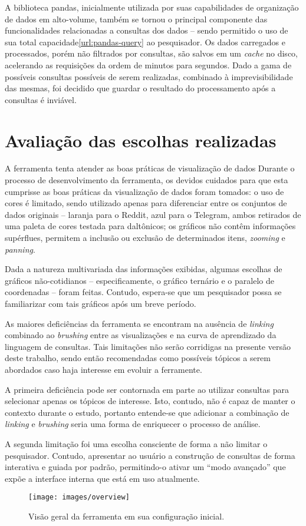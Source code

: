 A biblioteca pandas, inicialmente utilizada por suas capabilidades de organização de dados em alto-volume, também se tornou o principal componente das funcionalidades relacionadas a consultas dos dados -- sendo permitido o uso de sua total capacidade\ref{url:pandas-query} ao pesquisador. Os dados carregados e processados, porém não filtrados por consultas, são salvos em um \textit{cache} no disco, acelerando as requisições da ordem de minutos para segundos. Dado a gama de possíveis consultas possíveis de serem realizadas, combinado à imprevisibilidade das mesmas, foi decidido que guardar o resultado do processamento após a consultas é inviável.

\section{Avaliação das escolhas realizadas}

A ferramenta tenta atender as boas práticas de visualização de dados
Durante o processo de desenvolvimento da ferramenta, os devidos cuidados para que esta cumprisse as boas práticas da visualização de dados foram tomados: o uso de cores é limitado, sendo utilizado apenas para diferenciar entre os conjuntos de dados originais -- laranja para o Reddit, azul para o Telegram, ambos retirados de uma paleta de cores testada para daltônicos; os gráficos não contêm informações supérflues, permitem a inclusão ou exclusão de determinados itens, \textit{zooming} e \textit{panning}.

Dada a natureza multivariada das informações exibidas, algumas escolhas de gráficos não-cotidianos -- especificamente, o gráfico ternário e o paralelo de coordenadas -- foram feitas. Contudo, espera-se que um pesquisador possa se familiarizar com tais gráficos após um breve período.

As maiores deficiências da ferramenta se encontram na ausência de \textit{linking} combinado ao \textit{brushing} entre as visualizações e na curva de aprendizado da linguagem de consultas. Tais limitações não serão corridigas na presente versão deste trabalho, sendo então recomendadas como possíveis tópicos a serem abordados caso haja interesse em evoluir a ferramente.

A primeira deficiência pode ser contornada em parte ao utilizar consultas para selecionar apenas os tópicos de interesse. Isto, contudo, não é capaz de manter o contexto durante o estudo, portanto entende-se que adicionar a combinação de \textit{linking} e \textit{brushing} seria uma forma de enriquecer o processo de análise.

A segunda limitação foi uma escolha consciente de forma a não limitar o pesquisador. Contudo, apresentar ao usuário a construção de consultas de forma interativa e guiada por padrão, permitindo-o ativar um ``modo avançado'' que expõe a interface interna que está em uso atualmente.

\begin{figure*}[hbtp]
    \centering
    \texttt{[image: images/overview]}
    \caption{Visão geral da ferramenta em sua configuração inicial.}
    \label{fig:overview}
\end{figure*}